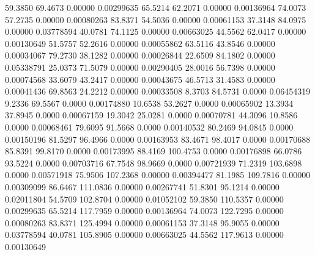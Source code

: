      59.3850      69.4673       0.00000           0.00299635
     65.5214      62.2071       0.00000           0.00136964
     74.0073      57.2735       0.00000           0.00080263
     83.8371      54.5036       0.00000           0.00061153
     37.3148      84.0975       0.00000           0.03778594
     40.0781      74.1125       0.00000           0.00663025
     44.5562      62.0417       0.00000           0.00130649
     51.5757      52.2616       0.00000           0.00055862
     63.5116      43.8546       0.00000           0.00034067
     79.2730      38.1282       0.00000           0.00026844
     22.6509      84.1802       0.00000           0.05338791
     25.0373      71.5079       0.00000           0.00290405
     28.0016      56.7398       0.00000           0.00074568
     33.6079      43.2417       0.00000           0.00043675
     46.5713      31.4583       0.00000           0.00041436
     69.8563      24.2212       0.00000           0.00033508
      8.3703      84.5731       0.0000           0.06454319
      9.2336      69.5567       0.0000           0.00174880
     10.6538      53.2627       0.0000           0.00065902
     13.3934      37.8945       0.0000           0.00067159
     19.3042      25.0281       0.0000           0.00070781
     44.3096      10.8586       0.0000           0.00068461
     79.6095      91.5668       0.0000           0.00140532
     80.2469      94.0845       0.0000           0.00150196
     81.5297      96.4966       0.0000           0.00163953
     83.4671      98.4017       0.0000           0.00170688
     85.8391      99.8170       0.0000           0.00173995
     88.4169     100.4753       0.0000           0.00176898
     66.0786      93.5224       0.0000           0.00703716
     67.7548      98.9669       0.0000           0.00721939
     71.2319     103.6898       0.0000           0.00571918
     75.9506     107.2368       0.00000           0.00394477
     81.1985     109.7816       0.00000           0.00309099
     86.6467     111.0836       0.00000           0.00267741
     51.8301      95.1214       0.00000           0.02011804
     54.5709     102.8704       0.00000           0.01052102
     59.3850     110.5357       0.00000           0.00299635
     65.5214     117.7959       0.00000           0.00136964
     74.0073     122.7295       0.00000           0.00080263
     83.8371     125.4994       0.00000           0.00061153
     37.3148      95.9055       0.00000           0.03778594
     40.0781     105.8905       0.00000           0.00663025
     44.5562     117.9613       0.00000           0.00130649
